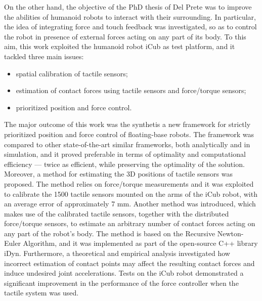 \documentclass[12pt,a4paper,twoside]{article}
\begin{document}
On the other hand, the objective of the PhD thesis of Del Prete was to improve the abilities of humanoid robots to interact with their surrounding. In particular, the idea of integrating force and touch feedback was investigated, so as to control the robot in presence of external forces acting on any part of its body. To this aim, this work exploited the humanoid robot iCub as test platform, and it tackled three main issues:
\begin{itemize}
\item spatial calibration of tactile sensors;
\item estimation of contact forces using tactile sensors and force/torque sensors;
\item prioritized position and force control.
\end{itemize}
The major outcome of this work was the synthetis a new framework for strictly prioritized position and force control of floating-base robots. The framework was compared to other state-of-the-art similar frameworks, both analytically and in simulation, and it proved preferable in terms of optimality and computational efficiency — twice as efficient, while preserving the optimality of the solution. Moreover, a method for estimating the 3D positions of tactile sensors was proposed. The method relies on force/torque measurements and it was exploited to calibrate the 1500 tactile sensors mounted on the arms of the iCub robot, with an average error of approximately 7 mm. Another method was introduced, which makes use of the calibrated tactile sensors, together with the distributed force/torque sensors, to estimate an arbitrary number of contact forces acting on any part of the robot’s body. The method is based on the Recursive Newton-Euler Algorithm, and it was implemented as part of  the open-source C++ library iDyn. Furthermore, a theoretical and empirical analysis investigated how incorrect estimation of contact points may affect the resulting contact forces and induce undesired joint accelerations. Tests on the iCub robot demonstrated a significant improvement in the performance of the force controller when the tactile system was used.\\
\end{document}
